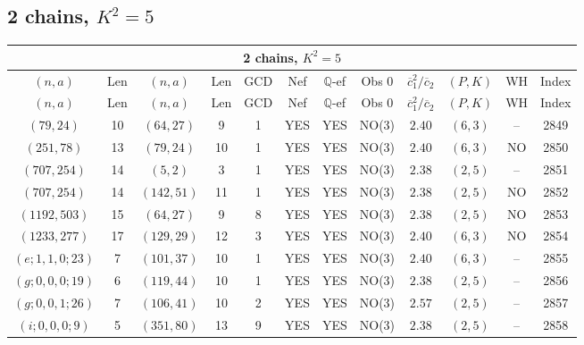 \subsection{2 chains, $K^2 = 5$}
\begin{longtable}{|c|c|c|c|c|c|c|c|c|c|c|c|}
\hline
\multicolumn{12}{|c|}{2 chains, $K^2 = 5$}\\
\hline
$(n,a)$ & Len & $(n,a)$ & Len & GCD & Nef & $\mathbb Q$-ef & Obs 0 & $\overline c_1^2 / \overline c_2$ & $(P,K)$ & WH & Index\\
\hline
\endfirsthead

\hline
$(n,a)$ & Len & $(n,a)$ & Len & GCD & Nef & $\mathbb Q$-ef & Obs 0 & $\overline c_1^2 / \overline c_2$ & $(P,K)$ & WH & Index\\
\hline
\endhead
\hline
\endfoot

$(79,24)$ & 10 & $(64,27)$ & 9 & 1 & YES & YES & NO(3) & $2.40$ & $(6,3)$ & -- & 2849\\
$(251,78)$ & 13 & $(79,24)$ & 10 & 1 & YES & YES & NO(3) & $2.40$ & $(6,3)$ & NO & 2850\\
$(707,254)$ & 14 & $(5,2)$ & 3 & 1 & YES & YES & NO(3) & $2.38$ & $(2,5)$ & -- & 2851\\
$(707,254)$ & 14 & $(142,51)$ & 11 & 1 & YES & YES & NO(3) & $2.38$ & $(2,5)$ & NO & 2852\\
$(1192,503)$ & 15 & $(64,27)$ & 9 & 8 & YES & YES & NO(3) & $2.38$ & $(2,5)$ & NO & 2853\\
$(1233,277)$ & 17 & $(129,29)$ & 12 & 3 & YES & YES & NO(3) & $2.40$ & $(6,3)$ & NO & 2854\\
$(e;1,1,0;23)$ & 7 & $(101,37)$ & 10 & 1 & YES & YES & NO(3) & $2.40$ & $(6,3)$ & -- & 2855\\
$(g;0,0,0;19)$ & 6 & $(119,44)$ & 10 & 1 & YES & YES & NO(3) & $2.38$ & $(2,5)$ & -- & 2856\\
$(g;0,0,1;26)$ & 7 & $(106,41)$ & 10 & 2 & YES & YES & NO(3) & $2.57$ & $(2,5)$ & -- & 2857\\
$(i;0,0,0;9)$ & 5 & $(351,80)$ & 13 & 9 & YES & YES & NO(3) & $2.38$ & $(2,5)$ & -- & 2858
\end{longtable}
